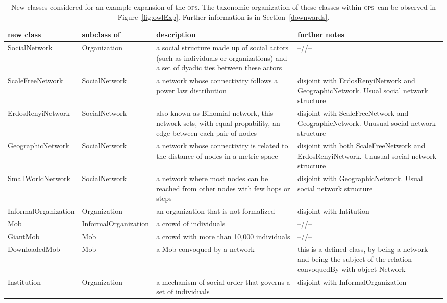 \documentclass[10pt,letterpaper]{article}
\newcommand{\ops}{\textsc{ops}}
\begin{document}
\begin{table}[!h]
\begin{adjustwidth}{-2.25in}{0in} %
  \centering
  \caption{New classes considered for an example expansion of the \ops.
  The taxonomic organization of these classes within \ops\ can be observed in Figure~\ref{fig:owlExp}.
  Further information is in Section~\ref{downwards}.}
  \begin{tabular}{|l|l|p{5.4cm}|p{5.3cm}|}\hline
{\bf new class} & {\bf subclass of} & {\bf description} & {\bf further notes} \\\hline\hline
SocialNetwork & Organization & a social structure made up of social actors (such as individuals or organizations) and a set of dyadic ties between these actors & --//--\\\hline
ScaleFreeNetwork & SocialNetwork & a network whose connectivity follows a power law distribution & disjoint with ErdosRenyiNetwork and GeographicNetwork. Usual social network structure \\ \hline
ErdosRenyiNetwork & SocialNetwork & also known as Binomial network, this network sets, with equal propability, an edge between each pair of nodes & disjoint with ScaleFreeNetwork and GeographicNetwork. Unusual social network structure \\\hline
GeographicNetwork & SocialNetwork & a network whose connectivity is related to the distance of nodes in a metric space & disjoint with both ScaleFreeNetwork and ErdosRenyiNetwork. Unusual social network structure \\\hline
SmallWorldNetwork & SocialNetwork & a network where most nodes can be reached from other nodes with few hops or steps & disjoint with GeographicNetwork. Usual social network structure \\\hline\hline
InformalOrganization & Organization & an organization that is not formalized & disjoint with Intitution \\ \hline
Mob & InformalOrganization & a crowd of individuals & --//-- \\\hline
GiantMob & Mob & a crowd with more than 10,000 individuals & --//--\\\hline
DownloadedMob & Mob & a Mob convoqued by a network & this is a defined class, by being a network and being the subject of the relation convoquedBy with object Network \\ \hline\hline
Institution & Organization & a mechanism of social order that governs a set of individuals & disjoint with InformalOrganization \\\hline

\end{tabular}
\end{adjustwidth}
\end{table}
\end{document}
